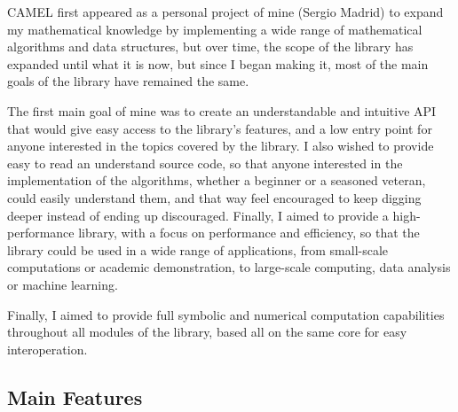 \documentclass[a4paper,oneside,8pt]{extarticle}
\theoremstyle{definition}
\begin{document}
CAMEL first appeared as a personal project of mine (Sergio Madrid) to expand my mathematical knowledge by implementing a wide range of mathematical algorithms and data structures, but over time, the scope of the library has expanded until what it is now, but since I began making it, most of the main goals of the library have remained the same.

The first main goal of mine was to create an understandable and intuitive API that would give easy access to the library's features, and a low entry point for anyone interested in the topics covered by the library. I also wished to provide easy to read an understand source code, so that anyone interested in the implementation of the algorithms, whether a beginner or a seasoned veteran, could easily understand them, and that way feel encouraged to keep digging deeper instead of ending up discouraged. Finally, I aimed to provide a high-performance library, with a focus on performance and efficiency, so that the library could be used in a wide range of applications, from small-scale computations or academic demonstration, to large-scale computing, data analysis or machine learning.

Finally, I aimed to provide full symbolic and numerical computation capabilities throughout all modules of the library, based all on the same core for easy interoperation.

\subsection{Main Features}
\end{document}
